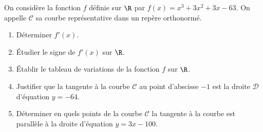 \medskip

On considère la fonction $f$ définie sur $\R$ par $f(x) = x^3 + 3x^2 + 3x -63$.
On appelle $\mathcal{C}$ sa courbe représentative dans un repère orthonormé.

\medskip

\begin{enumerate}
\item Déterminer $f'(x)$.
\item Étudier le signe de $f'(x)$ sur $\R$.
\item Établir le tableau de variations de la fonction $f$ sur $\R$.
\item Justifier que la tangente à la courbe $\mathcal{C}$ au point d'abscisse $-1$ est la droite $\mathcal{D}$ d'équation
$y= -64$.
\item Déterminer en quels points de la courbe $\mathcal{C}$ la tangente à la courbe est parallèle à la droite
d'équation $y = 3x - 100$.
\end{enumerate}

\vspace{0,5cm}
